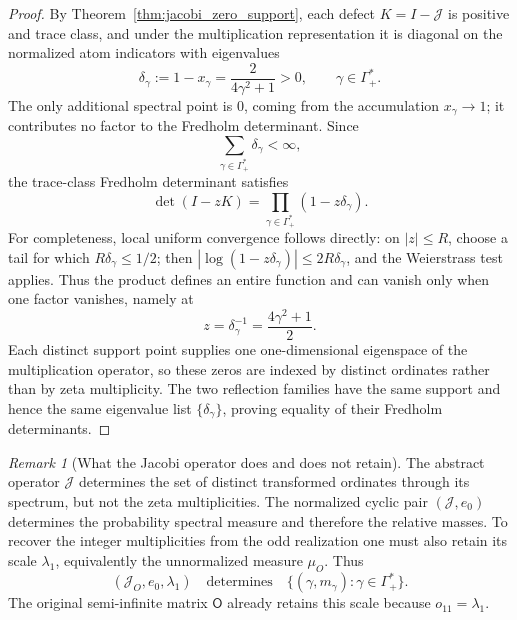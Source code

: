 \documentclass[11pt]{amsart}
\numberwithin{equation}{section}
\theoremstyle{plain}
\theoremstyle{definition}
\theoremstyle{remark}
\newtheorem{remark}[theorem]{Remark}
\newcommand{\Omat}{\mathsf O}
\begin{document}
\begin{proof}
By Theorem~\ref{thm:jacobi_zero_support}, each defect $K=I-\mathcal J$ is positive and trace class, and under the multiplication representation it is diagonal on the normalized atom indicators with eigenvalues
\begin{equation}
\delta_\gamma:=1-x_\gamma=\frac{2}{4\gamma^2+1}>0,
\qquad \gamma\in\Gamma_+^*.
\end{equation}
The only additional spectral point is $0$, coming from the accumulation $x_\gamma\to1$; it contributes no factor to the Fredholm determinant.  Since
\begin{equation}
\sum_{\gamma\in\Gamma_+^*}\delta_\gamma<\infty,
\end{equation}
the trace-class Fredholm determinant satisfies
\begin{equation}
\det(I-zK)=\prod_{\gamma\in\Gamma_+^*}(1-z\delta_\gamma).
\end{equation}
For completeness, local uniform convergence follows directly: on $|z|\le R$, choose a tail for which $R\delta_\gamma\le1/2$; then
$|\log(1-z\delta_\gamma)|\le2R\delta_\gamma$, and the Weierstrass test applies.  Thus the product defines an entire function and can vanish only when one factor vanishes, namely at
\begin{equation}
z=\delta_\gamma^{-1}=\frac{4\gamma^2+1}{2}.
\end{equation}
Each distinct support point supplies one one-dimensional eigenspace of the multiplication operator, so these zeros are indexed by distinct ordinates rather than by zeta multiplicity.  The two reflection families have the same support and hence the same eigenvalue list $\{\delta_\gamma\}$, proving equality of their Fredholm determinants.
\end{proof}

\begin{remark}[What the Jacobi operator does and does not retain]
\label{rem:operator_support_vs_multiplicity}
The abstract operator $\mathcal J$ determines the set of distinct transformed ordinates through its spectrum, but not the zeta multiplicities.  The normalized cyclic pair $(\mathcal J,e_0)$ determines the probability spectral measure and therefore the relative masses.  To recover the integer multiplicities from the odd realization one must also retain its scale $\lambda_1$, equivalently the unnormalized measure $\mu_O$.  Thus
\begin{equation}
(\mathcal J_O,e_0,\lambda_1)
\quad\text{determines}\quad
\{(\gamma,m_\gamma):\gamma\in\Gamma_+^*\}.
\label{eq:operator_cyclic_scale_data}
\end{equation}
The original semi-infinite matrix $\Omat$ already retains this scale because $o_{11}=\lambda_1$.
\end{remark}
\end{document}

